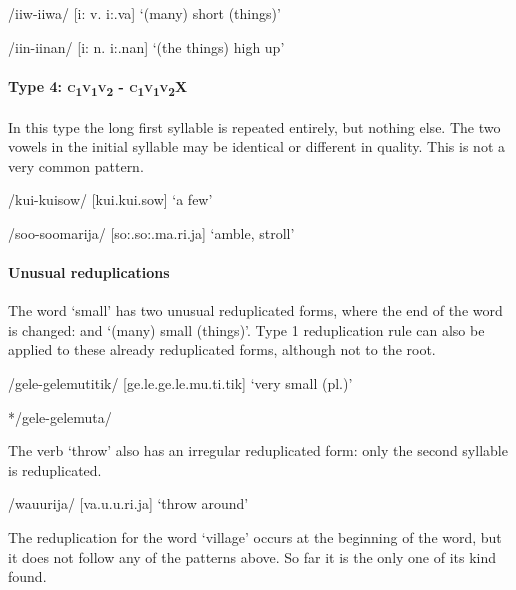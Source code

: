 /iiw-iiwa/  [{{\textprimstress}}i: v.{{\textprimstress}}{{\textprimstress}} i:.va]  `(many) short (things)'

/iin-iinan/  [{{\textprimstress}}i: n.{{\textprimstress}{{\textprimstress}} i:.nan}]  `(the things) high up'

\paragraph[Type 4:  \textsc{c1v1v2} - \textsc{c1v1v2X}]{Type 4:  \textsc{c}\textsubscript{1}\textsc{v}\textsubscript{1}\textsc{v}\textsubscript{2} - \textsc{c}\textsubscript{1}\textsc{v}\textsubscript{1}\textsc{v}\textsubscript{2}X}

In this type the long first syllable is repeated entirely, but nothing else.  The two vowels in the initial syllable may be identical or different in quality. This is not a very common pattern.

/kui-kuisow/  [{{\textprimstress}}kui.{{\textprimstress}}{{\textprimstress}}kui.sow]  `a few'

/soo-soomarija/  [{{\textprimstress}}so:.{{\textprimstress}}{{\textprimstress}}so:.ma.ri.ja]  `amble, stroll'

\paragraph[Unusual reduplications]{Unusual reduplications}

The word  `small' has two unusual reduplicated forms, where the end of the word is changed:  and  `(many) small (things)'.  Type 1 reduplication rule can also be applied to these already reduplicated forms, although not to the root.

/gele-gelemutitik/  [ge.{{\textprimstress}}le.ge.{{\textprimstress}}{{\textprimstress}}le.mu.ti.tik]  `very small (pl.)'

*/gele-gelemuta/

The verb  `throw' also has an irregular reduplicated form: only the second syllable is reduplicated.

/wa{\textphi}u{\textphi}urija/  [va.{{\textprimstress}}{\textphi}u.{\textphi}u.ri.ja]  `throw around'

The reduplication for the word  `village' occurs at the beginning of the word, but it does not follow any of the patterns above. So far it is the only one of its kind found.

